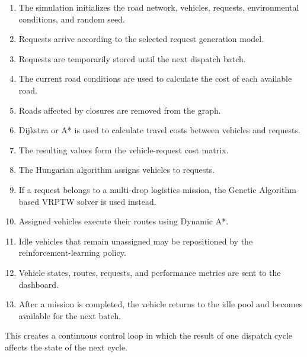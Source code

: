 \documentclass[12pt,a4paper]{article}
\begin{document}
\begin{enumerate}
    \item The simulation initializes the road network, vehicles,
    requests, environmental conditions, and random seed.

    \item Requests arrive according to the selected request
    generation model.

    \item Requests are temporarily stored until the next dispatch
    batch.

    \item The current road conditions are used to calculate the cost
    of each available road.

    \item Roads affected by closures are removed from the graph.

    \item Dijkstra or A* is used to calculate travel costs between
    vehicles and requests.

    \item The resulting values form the vehicle-request cost matrix.

    \item The Hungarian algorithm assigns vehicles to requests.

    \item If a request belongs to a multi-drop logistics mission,
    the Genetic Algorithm based VRPTW solver is used instead.

    \item Assigned vehicles execute their routes using Dynamic A*.

    \item Idle vehicles that remain unassigned may be repositioned
    by the reinforcement-learning policy.

    \item Vehicle states, routes, requests, and performance metrics
    are sent to the dashboard.

    \item After a mission is completed, the vehicle returns to the
    idle pool and becomes available for the next batch.
\end{enumerate}

This creates a continuous control loop in which the result of one
dispatch cycle affects the state of the next cycle.
\end{document}
